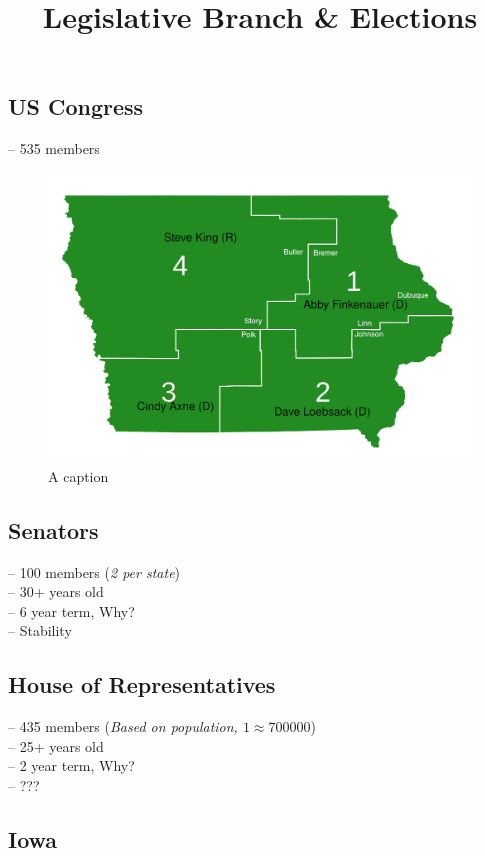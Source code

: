 \documentclass[]{article}
\title{Legislative Branch \& Elections}
\author{}
\date{}
\begin{document}
\maketitle

\subsection*{US Congress}
-- 535 members

\begin{figure}
	\includegraphics[width=1.1\linewidth]{iowa-districts.png}
	\caption{A caption}
\end{figure}

\subsection*{Senators}
-- 100 members (\emph{2 per state}) \\
-- 30+ years old \\
-- 6 year term, Why? \\
\indent-- Stability

\subsection*{House of Representatives}
-- 435 members (\emph{Based on population, $1 \approx 700000$}) \\
-- 25+ years old \\
-- 2 year term, Why? \\
\indent-- ???

\subsection*{Iowa}
\end{document}
